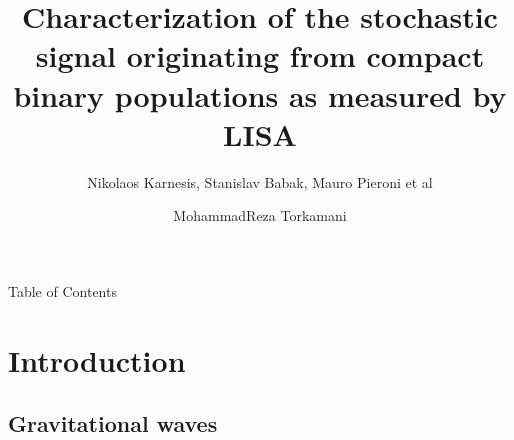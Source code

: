 \documentclass[pdf]{beamer}
\title[Stochastic signal originating from CGBs mesured by LISA]{Characterization of the stochastic signal originating from compact binary
populations as measured by LISA}
\subtitle{Nikolaos Karnesis, Stanislav Babak, Mauro Pieroni et al}
\author{MohammadReza Torkamani}
\begin{document}

\begin{frame}
    \titlepage
\end{frame}

\begin{frame}{Table of Contents}
\vspace*{.1cm}
  \tableofcontents
\end{frame}
\section{Introduction}
\subsection{Gravitational waves}
\end{document}
